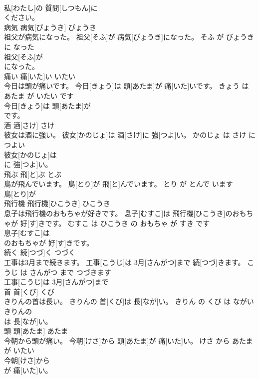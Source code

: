 \documentclass[8pt]{extreport}
\begin{document}
\begin{CJK}{UTF8}{min}
\\	私[わたし]の 質問[しつもん]に
\\	ください。			
\\	病気	病気[びょうき]	びょうき	
\\	祖父が病気になった。	祖父[そふ]が 病気[びょうき]になった。	そふ が びょうき に なった	
\\	祖父[そふ]が
\\	になった。			
\\	痛い	痛[いた]い	いたい	
\\	今日は頭が痛いです。	今日[きょう]は 頭[あたま]が 痛[いた]いです。	きょう は あたま が いたい です	
\\	今日[きょう]は 頭[あたま]が
\\	です。			
\\	酒	酒[さけ]	さけ	
\\	彼女は酒に強い。	彼女[かのじょ]は 酒[さけ]に 強[つよ]い。	かのじょ は さけ に つよい	
\\	彼女[かのじょ]は
\\	に 強[つよ]い。			
\\	飛ぶ	飛[と]ぶ	とぶ	
\\	鳥が飛んでいます。	鳥[とり]が 飛[と]んでいます。	とり が とんで います	
\\	鳥[とり]が
\\	飛行機	飛行機[ひこうき]	ひこうき	
\\	息子は飛行機のおもちゃが好きです。	息子[むすこ]は 飛行機[ひこうき]のおもちゃが 好[す]きです。	むすこ は ひこうき の おもちゃ が すき です	
\\	息子[むすこ]は
\\	のおもちゃが 好[す]きです。			
\\	続く	続[つづ]く	つづく	
\\	工事は3月まで続きます。	工事[こうじ]は 3月[さんがつ]まで 続[つづ]きます。	こうじ は さんがつ まで つづきます	
\\	工事[こうじ]は 3月[さんがつ]まで
\\	首	首[くび]	くび	
\\	きりんの首は長い。	きりんの 首[くび]は 長[なが]い。	きりん の くび は ながい	
\\	きりんの
\\	は 長[なが]い。			
\\	頭	頭[あたま]	あたま	
\\	今朝から頭が痛い。	今朝[けさ]から 頭[あたま]が 痛[いた]い。	けさ から あたま が いたい	
\\	今朝[けさ]から
\\	が 痛[いた]い。			

\end{CJK}
\end{document}

